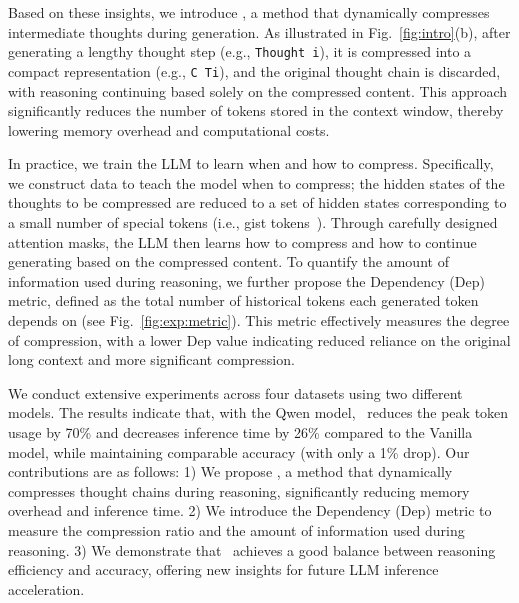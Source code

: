 Based on these insights, we introduce \ours, a method that dynamically compresses intermediate thoughts during generation. 
As illustrated in Fig.~\ref{fig:intro}(b), after generating a lengthy thought step (e.g., \texttt{Thought i}), it is compressed into a compact representation (e.g., \texttt{C Ti}), and the original thought chain is discarded, with reasoning continuing based solely on the compressed content. 
This approach significantly reduces the number of tokens stored in the context window, thereby lowering memory overhead and computational costs.

In practice, we train the LLM to learn when and how to compress. 
Specifically, we construct data to teach the model when to compress; the hidden states of the thoughts to be compressed are reduced to a set of hidden states corresponding to a small number of special tokens (i.e., gist tokens~\citep{nips23_gist}).
Through carefully designed attention masks, the LLM then learns how to compress and how to continue generating based on the compressed content.
{To quantify the amount of information used during reasoning, we further propose the Dependency (Dep) metric, defined as the total number of historical tokens each generated token depends on (see Fig.~\ref{fig:exp:metric}). 
This metric effectively measures the degree of compression, with a lower Dep value indicating reduced reliance on the original long context and more significant compression.}

We conduct extensive experiments across four datasets using two different models. 
The results indicate that, with the Qwen model, \ours~reduces the peak token usage by 70\% and decreases inference time by 26\% compared to the Vanilla model, while maintaining comparable accuracy (with only a 1\% drop).
Our contributions are as follows:
1) We propose \ours, a method that dynamically compresses thought chains during reasoning, significantly reducing memory overhead and inference time.
2) We introduce the Dependency (Dep) metric to measure the compression ratio and the amount of information used during reasoning.
3) We demonstrate that \ours~achieves a good balance between reasoning efficiency and accuracy, offering new insights for future LLM inference acceleration.